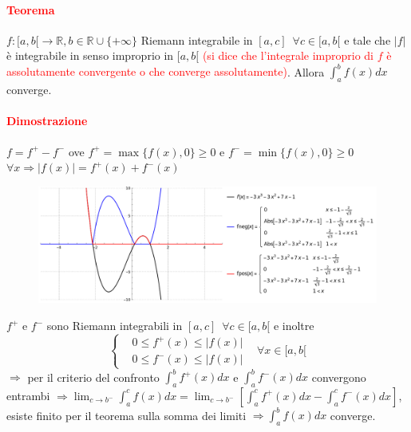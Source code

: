 \documentclass{article}
\newcommand{\R}{\mathbb{R}}
\begin{document}
\paragraph{\textcolor{red}{Teorema}}
$f:[a,b[\rightarrow \R, b \in \R \cup \{+\infty\}$ Riemann integrabile in $[a,c] \,\,\, \forall c \in [a,b[$ e tale che $|f|$ è integrabile in senso improprio in $[a,b[$ \textcolor{red}{(si dice che l'integrale improprio di $f$ è assolutamente convergente o che converge assolutamente)}. Allora $\int_{a}^{b} f(x)dx$ converge.

\paragraph{\textcolor{red}{Dimostrazione}}
$f=f^+-f^-$ ove $f^+=\max\{f(x),0\} \geq 0$ e $f^-=\min\{f(x),0\} \geq 0$ $\forall x \Rightarrow |f(x)|=f^+(x)+f^-(x)$\\
\begin{figure}[h!]
    \centering
    \includegraphics[width=\textwidth]{fposfneg.png}
\end{figure}

$f^+$ e $f^-$ sono Riemann integrabili  in  $[a,c]\,\,\, \forall c\in [a,b[$ e inoltre
\begin{equation*}
\begin{cases}
    & 0 \leq f^+(x) \leq |f(x)|\\
    & 0 \leq f^-(x) \leq |f(x)|
\end{cases}
 \,\,\,\,\, \forall x \in [a,b[
\end{equation*}
$\Longrightarrow$ per il criterio del confronto $\int_{a}^{b} f^+(x)dx$ e $\int_{a}^{b} f^-(x)dx$ convergono entrambi $\Rightarrow \lim_{c \rightarrow b^-} \int_{a}^{c} f(x)dx = \lim_{c \rightarrow b^-} \left[ \int_{a}^{c}f^+(x)dx - \int_{a}^{c}f^-(x)dx \right]$, esiste finito per il teorema sulla somma dei limiti $\Rightarrow \int_{a}^{b} f(x) dx$ converge.
\end{document}
